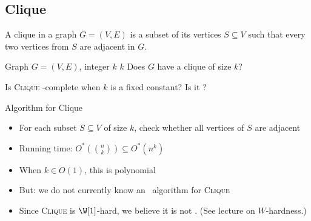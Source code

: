 \subsection{Clique}

\begin{frame}

 A \alert{clique} in a graph $G=(V,E)$ is a subset of its vertices $S\subseteq V$ such that every two vertices from $S$ are adjacent in $G$.
 
  {Graph $G=(V,E)$, integer $k$}
  {$k$}
  {Does $G$ have a clique of size $k$?}
 
\begin{center}
\end{center}

\noindent
Is \textsc{Clique} \NP-complete when $k$ is a fixed constant? Is it \FPT?
\end{frame}


\begin{frame}{Algorithm for Clique}
 \begin{itemize}
  \item For each subset $S\subseteq V$ of size $k$, check whether all vertices of $S$ are adjacent
  \item Running time: $O^*\left( \binom{n}{k} \right) \subseteq O^*(n^k)$
  \item When $k\in O(1)$, this is polynomial
  \item But: we do not currently know an \FPT\ algorithm for \textsc{Clique}
  \item Since \textsc{Clique} is $\W[1]$-hard, we believe it is not \FPT. (See lecture on $W$-hardness.)
 \end{itemize}
\end{frame}


